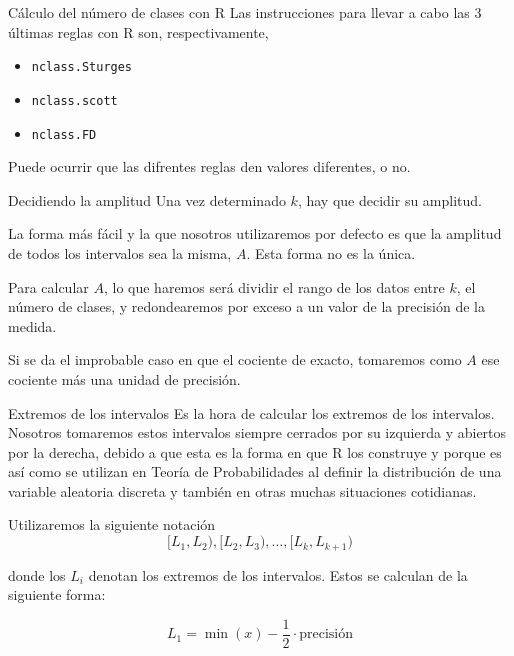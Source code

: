 \documentclass[
  ignorenonframetext,
  aspectratio=169]{beamer}
\providecommand{\tightlist}{%
  \setlength{\itemsep}{0pt}\setlength{\parskip}{0pt}}
\begin{document}
\begin{frame}[fragile]{Cálculo del número de clases con R}
\label{cuxe1lculo-del-nuxfamero-de-clases-con-r}
Las instrucciones para llevar a cabo las 3 últimas reglas con R son,
respectivamente,

\begin{itemize}
\tightlist
\item
  \texttt{nclass.Sturges}
\item
  \texttt{nclass.scott}
\item
  \texttt{nclass.FD}
\end{itemize}

Puede ocurrir que las difrentes reglas den valores diferentes, o no.
\end{frame}

\begin{frame}{Decidiendo la amplitud}
\label{decidiendo-la-amplitud}
Una vez determinado \(k\), hay que decidir su amplitud.

La forma más fácil y la que nosotros utilizaremos por defecto es que la
amplitud de todos los intervalos sea la misma, \(A\). Esta forma no es
la única.

Para calcular \(A\), lo que haremos será dividir el rango de los datos
entre \(k\), el número de clases, y redondearemos por exceso a un valor
de la precisión de la medida.

Si se da el improbable caso en que el cociente de exacto, tomaremos como
\(A\) ese cociente más una unidad de precisión.
\end{frame}

\begin{frame}{Extremos de los intervalos}
\label{extremos-de-los-intervalos}
Es la hora de calcular los extremos de los intervalos. Nosotros
tomaremos estos intervalos siempre cerrados por su izquierda y abiertos
por la derecha, debido a que esta es la forma en que R los construye y
porque es así como se utilizan en Teoría de Probabilidades al definir la
distribución de una variable aleatoria discreta y también en otras
muchas situaciones cotidianas.

Utilizaremos la siguiente notación
\[[L_1,L_2),[L_2,L_3),\dots,[L_k,L_{k+1})\]

donde los \(L_i\) denotan los extremos de los intervalos. Estos se
calculan de la siguiente forma:

\[L_1 = \min(x)-\frac{1}{2}\cdot \text{precisión}\]
\end{frame}
\end{document}
